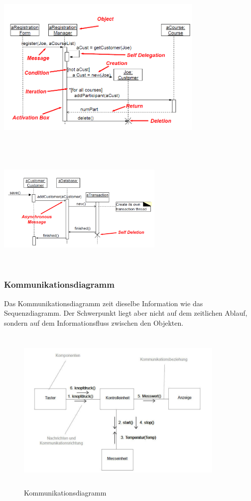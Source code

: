 \begin{minipage}[hbt]{1cm}
	\centering
	\includegraphics[height=8cm, width = 10cm,]{images/Modellierung/Sequenzdiagramm}
	\label{Bild1}
\end{minipage}
\hfill
\begin{minipage}[hbt]{8cm}
	\centering
	\includegraphics[height=6cm, width = 8cm,]{images/Modellierung/Sequenzdiagramm2}
	\label{Bild2}
\end{minipage}

\newpage
\subsubsection{Kommunikationsdiagramm }
Das Kommunikationsdiagramm zeit dieselbe Information wie das Sequenzdiagramm. Der Schwerpunkt liegt aber
nicht auf dem zeitlichen Ablauf, sondern auf dem Informationsfluss zwischen den Objekten.

\begin{figure}[h]
	\centering
	\includegraphics[height=8cm, width = 10cm,]{images/Modellierung/Kommunikationsdiagramm}
	\caption{Kommunikationsdiagramm}
\end{figure}


